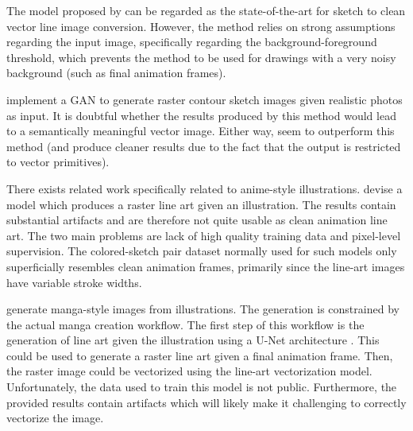 The model proposed by \citet{Puhachov2021KeypointPolyvector} can be regarded as the state-of-the-art for sketch to clean vector line image conversion. However, the method relies on strong assumptions regarding the input image, specifically regarding the background-foreground threshold, which prevents the method to be used for drawings with a very noisy background (such as final animation frames).

\citet{LIPS2019} implement a GAN to generate raster contour sketch images given realistic photos as input. It is doubtful whether the results produced by this method would lead to a semantically meaningful vector image. Either way, \citet{mo2021virtualsketching} seem to outperform this method (and produce cleaner results due to the fact that the output is restricted to vector primitives).

There exists related work specifically related to anime-style illustrations. \citep{sketch} devise a model which produces a raster line art given an illustration. The results contain substantial artifacts and are therefore not quite usable as clean animation line art. The two main problems are lack of high quality training data and pixel-level supervision. The colored-sketch pair dataset normally used for such models \citep{pixiv} only superficially resembles clean animation frames, primarily since the line-art images have variable stroke widths.

\citet{Manga2021zhang} generate manga-style images from illustrations. The generation is constrained by the actual manga creation workflow. The first step of this workflow is the generation of line art given the illustration using a U-Net architecture \citep{DBLP:conf/miccai/RonnebergerFB15}. This could be used to generate a raster line art given a final animation frame. Then, the raster image could be vectorized using the line-art vectorization model. Unfortunately, the data used to train this model is not public. Furthermore, the provided results contain artifacts which will likely make it challenging to correctly vectorize the image.